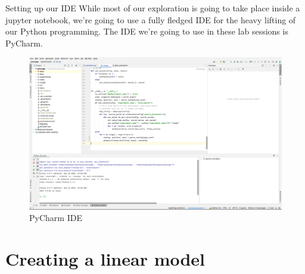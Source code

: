 \documentclass[10pt]{beamer}
\begin{document}
\begin{frame}[label={sec:org38b7342}]{Setting up our IDE}
While most of our exploration is going to take place inside a jupyter notebook,
we're going to use a fully fledged IDE for the heavy lifting of our Python
programming. The IDE we're going to use in these lab sessions is PyCharm.

\begin{figure}[htbp]
\centering
\includegraphics[width=.9\linewidth]{images/pycharm.png}
\caption{PyCharm IDE}
\end{figure}
\end{frame}

\section*{Creating a linear model}
\label{sec:org919fea7}

\subsection*{}
\label{sec:orgbb8e1c9}
\end{document}
